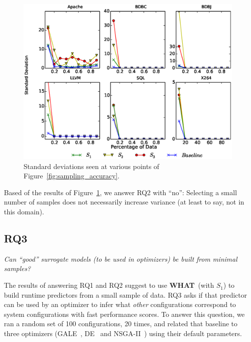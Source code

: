 \documentclass[smallextended]{svjour3}       %
\newcommand{\fig}[1]{Figure~\ref{fig:#1}}
\newcommand{\what}{{\bf WHAT}\xspace}
\begin{document}
\begin{figure}[t]
\includegraphics[width=\columnwidth]{Figures/Variance}
\centering
\caption{Standard deviations seen at various points of  \fig{sampling_accuracy}.}\label{fig:Variance}
\end{figure}

\begin{myshadowbox}
Based of the results of Figure~\ref{fig:Variance}, we answer RQ2 with ``no'': Selecting a small number of samples does not necessarily increase variance (at least to say, not in this domain).
\end{myshadowbox}


\subsection{RQ3}

\begin{center}
{\em
Can ``good'' surrogate models (to be used in optimizers)
be built from minimal samples?}
\end{center}

The results of answering RQ1 and RQ2 suggest to use \what~(with $S_1$) to build runtime predictors from a small sample of  data. RQ3
asks if that predictor can be used by an optimizer to infer what {\em other} configurations correspond to system configurations with fast performance scores.
To answer this question,  we ran  a random set of 100 
configurations, 20 times, and related that baseline to three optimizers (GALE~\cite{krall2014gale}, DE~\cite{storn1997differential} and  NSGA-II~\cite{deb00afast}) using their
default parameters.
 
\end{document}
